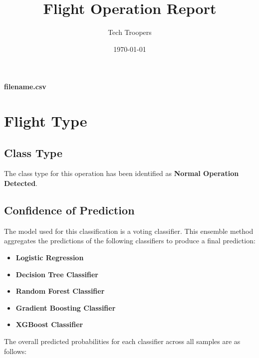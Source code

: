 \documentclass{article}
\title{Flight Operation Report}
\author{Tech Troopers}
\date{\today}
\begin{document}
\maketitle

\begin{center}
\large{\textbf{filename.csv}}
\end{center}

\section{Flight Type}

\subsection{Class Type}
The class type for this operation has been identified as \textbf{Normal Operation Detected}.

\subsection{Confidence of Prediction}
The model used for this classification is a voting classifier. This ensemble method aggregates the predictions of the following classifiers to produce a final prediction:

\begin{itemize}
    \item \textbf{Logistic Regression}
    \item \textbf{Decision Tree Classifier}
    \item \textbf{Random Forest Classifier}
    \item \textbf{Gradient Boosting Classifier}
    \item \textbf{XGBoost Classifier}
\end{itemize}

The overall predicted probabilities for each classifier across all samples are as follows:

\begin{table}[h]
\centering
{}
\caption{Overall Predicted Probabilities for Each Classifier}
\label{table:overall_probabilities}
\end{table}
\end{document}
